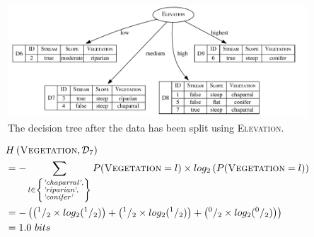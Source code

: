 \documentclass[xcolor={table}]{beamer}
\newcommand{\featN}[1]{\textsc{#1}}
\newcommand{\featL}[1]{\textit{'#1'}}
\newcommand{\ourRef}[1]{\ref{#1} $^{\text{\tiny[\pageref{#1}]}}$}
\begin{document}
 \begin{frame} 
\begin{figure}
\centerline{
	\includegraphics[width=1.0\textwidth]{./images/ex-hand-ecology-dectree1_mod.pdf}
}
\caption{The decision tree after the data has been split using \featN{Elevation}.}
\label{fig:ex-hand-dectree1}
\end{figure}
\end{frame} 



 \begin{frame} 
 \begin{footnotesize}
\begin{equation*}
	\begin{alignedat}{2}
&H\left(\featN{Vegetation},\mathcal{D}_7\right)\\
&= - \sum_{l \in  \left\{ \begin{subarray}{1} \featL{chaparral}, \\ \featL{riparian}, \\ \featL{conifer} \end{subarray} \right\}} P(\featN{Vegetation}=l) \times log_2\left(P(\featN{Vegetation}=l)\right)\\
		&= -\left( \left( ^1/_2 \times log_2(^1/_2) \right) + \left(^1/_2  \times log_2(^1/_2) \right) + \left(^0/_2  \times log_2(^0/_2) \right) \right)\\
		&= 1.0~bits 	
	\end{alignedat}
	\label{eq:ent-D7}
\end{equation*}
\end{footnotesize}
\end{frame} 
\end{document}
